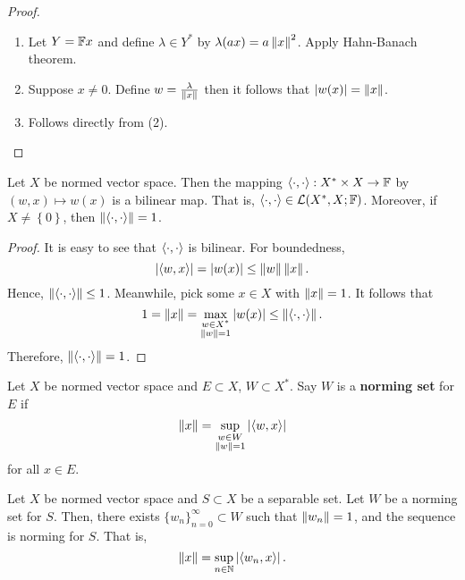 \documentclass[a4paper]{article}
\renewcommand{\seqinfn}[1]{\{ #1 \}_{n=0}^\infty}
\begin{document}
\begin{proof}

\begin{enumerate}
\item Let $Y = \mathbb{F} x$ and define $\lambda \in Y^*$ by
$\lambda(a x) = a \left\lVert x\right\rVert^2$. Apply Hahn-Banach theorem.

\item Suppose $x \neq 0$. Define $w = \frac{\lambda}{\left\lVert x\right\rVert}$
then it follows that $\left\lvert w(x)\right\rvert = \left\lVert x\right\rVert$.

\item Follows directly from (2).
\end{enumerate}

\end{proof}

\begin{prop}
Let $X$ be normed vector space. Then the mapping
$\left\langle \cdot, \cdot \right\rangle : X^* \times X \to \mathbb{F}$ by
$(w, x) \mapsto w(x)$ is a bilinear map. That is,
$\left\langle \cdot , \cdot \right\rangle \in \mathcal{L}(X^*, X ; \mathbb{F})$.
Moreover,
if $X \neq \left\{ 0 \right\}$,
then $\left\lVert \left\langle \cdot, \cdot \right\rangle\right\rVert
= 1$.
\end{prop}

\begin{proof}
It is easy to see that $\left\langle \cdot, \cdot \right\rangle$ is
bilinear.  For boundedness,
\[
\left\lvert \left\langle w, x \right\rangle\right\rvert = \left\lvert w(x)\right\rvert \leq \left\lVert w\right\rVert \left\lVert x\right\rVert.
\]
Hence, $\left\lVert \left\langle \cdot, \cdot \right\rangle\right\rVert \leq 1$. Meanwhile,
pick some $x \in X$ with $\left\lVert x\right\rVert = 1$. It follows that
\[
1 = \left\lVert x\right\rVert = \max_{\substack{w \in X^* \\ \left\lVert w\right\rVert = 1}}
\left\lvert w(x)\right\rvert \leq \left\lVert \left\langle \cdot, \cdot \right\rangle\right\rVert.
\]
Therefore, $\left\lVert \left\langle \cdot, \cdot \right\rangle\right\rVert = 1$.
\end{proof}

\begin{defi}
  Let $X$ be normed vector space and $E \subset X$,
  $W \subset X^*$. Say $W$ is a \textbf{norming set}
  for $E$ if
  \[
  \left\lVert x\right\rVert = \sup_{\substack{w \in W \\ \left\lVert w\right\rVert = 1}}
  \left\lvert \left\langle w, x \right\rangle\right\rvert
  \]
  for all $x \in E$.
\end{defi}

\begin{prop}

Let $X$ be normed vector space and $S \subset X$ be a
separable set. Let $W$ be a norming set for $S$. Then,
there exists $\seqinfn{w_n} \subset W$ such that $\left\lVert w_n\right\rVert
= 1$, and the sequence is norming for $S$. That is,
\[
\left\lVert x\right\rVert = \sup_{n \in \mathbb{N}} \left\lvert \left\langle w_n, x \right\rangle\right\rvert.
\]
\end{prop}
\end{document}
